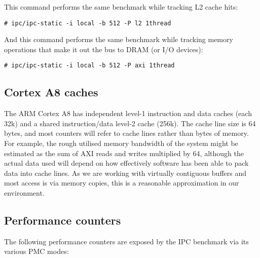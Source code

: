 \documentclass[a4paper,10pt]{article}
\begin{document}
\noindent
This command performs the same benchmark while tracking L2 cache hits:

\begin{verbatim}
# ipc/ipc-static -i local -b 512 -P l2 1thread
\end{verbatim}

\noindent
And this command performs the same benchmark while tracking memory operations
that make it out the bus to DRAM (or I/O devices):

\begin{verbatim}
# ipc/ipc-static -i local -b 512 -P axi 1thread
\end{verbatim}

\subsection*{Cortex A8 caches}

The ARM Cortex A8 has independent level-1 instruction and data caches (each
32k) and a shared instruction/data level-2 cache (256k).
The cache line size is 64 bytes, and most counters will refer to cache lines
rather than bytes of memory.
For example, the rough utilised memory bandwidth of the system might be
estimated as the sum of AXI reads and writes multiplied by 64, although the
actual data used will depend on how effectively software has been able to pack
data into cache lines.
As we are working with virtually contiguous buffers and most access is via
memory copies, this is a reasonable approximation in our environment.

\subsection*{Performance counters}

The following performance counters are exposed by the IPC benchmark via its
various PMC modes:
\end{document}
